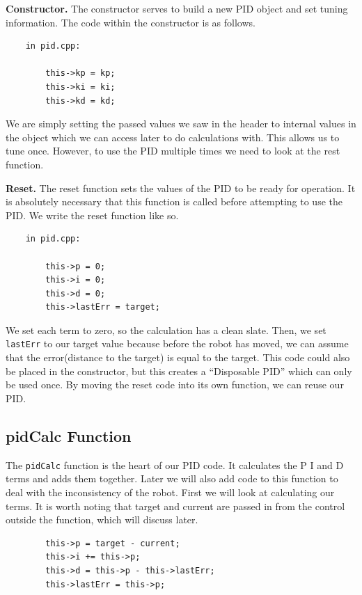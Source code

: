 \documentclass[12pt]{report}
\begin{document}
    \textbf{Constructor.} The constructor serves to build a new PID object and set tuning information. The code within the constructor is as follows.

    \begin{verbatim}
    in pid.cpp:

        this->kp = kp;
        this->ki = ki;
        this->kd = kd;
    \end{verbatim}

    We are simply setting the passed values we saw in the header to internal values in the object which we can access later to do calculations with.
    This allows us to tune once. 
    However, to use the PID multiple times we need to look at the rest function.

    \textbf{Reset.} The reset function sets the values of the PID to be ready for operation. 
    It is absolutely necessary that this function is called before attempting to use the PID.
    We write the reset function like so.

    \begin{verbatim}
    in pid.cpp:

        this->p = 0;
        this->i = 0;
        this->d = 0;
        this->lastErr = target;
    \end{verbatim}

    We set each term to zero, so the calculation has a clean slate.
    Then, we set \verb|lastErr| to our target value because before the robot has moved, we can assume that the error(distance to the target) is equal to the target.
    This code could also be placed in the constructor, but this creates a ``Disposable PID'' which can only be used once.
    By moving the reset code into its own function, we can reuse our PID.

\subsection{pidCalc Function}

    The \verb|pidCalc| function is the heart of our PID code. It calculates the P I and D terms and adds them together. Later we will also add code to this function to deal with the inconsistency of the robot. First we will look at calculating our terms. It is worth noting that target and current are passed in from the control outside the function, which will discuss later.
    \begin{verbatim}
        this->p = target - current;
        this->i += this->p;
        this->d = this->p - this->lastErr;
        this->lastErr = this->p;
    \end{verbatim}
\end{document}
